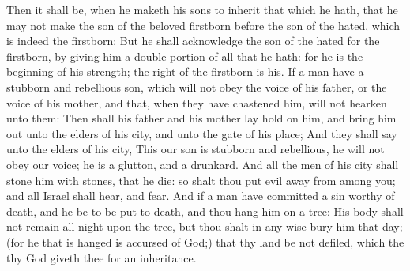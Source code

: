\begin{biblechapter}
\verse Then it shall be, when he maketh his sons to inherit that which he hath, that he may not make the son of the beloved firstborn before the son of the hated, which is indeed the firstborn:
\verse But he shall acknowledge the son of the hated for the firstborn, by giving him a double portion of all that he hath: for he is the beginning of his strength; the right of the firstborn is his.
 If a man have a stubborn and rebellious son, which will not obey the voice of his father, or the voice of his mother, and that, when they have chastened him, will not hearken unto them:
\verse Then shall his father and his mother lay hold on him, and bring him out unto the elders of his city, and unto the gate of his place;
\verse And they shall say unto the elders of his city, This our son is stubborn and rebellious, he will not obey our voice; he is a glutton, and a drunkard.
\verse And all the men of his city shall stone him with stones, that he die: so shalt thou put evil away from among you; and all Israel shall hear, and fear.
 And if a man have committed a sin worthy of death, and he be to be put to death, and thou hang him on a tree:
\verse His body shall not remain all night upon the tree, but thou shalt in any wise bury him that day; (for he that is hanged is accursed of God;) that thy land be not defiled, which the \LORD thy God giveth thee for an inheritance.
\end{biblechapter}

